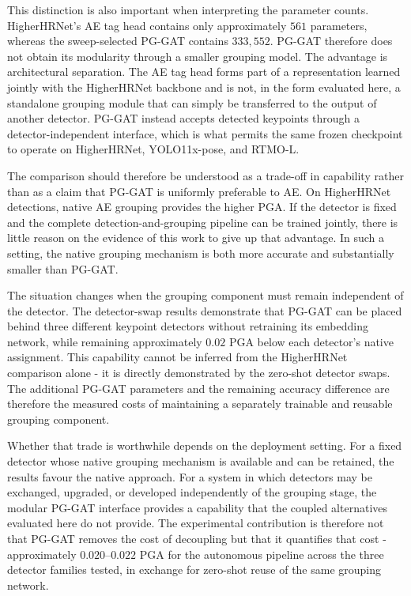 This distinction is also important when interpreting the parameter
counts.
HigherHRNet's AE tag head contains only approximately $561$ parameters,
whereas the sweep-selected PG-GAT contains $333{,}552$.
PG-GAT therefore does not obtain its modularity through a smaller
grouping model.
The advantage is architectural separation.
The AE tag head forms part of a representation learned jointly with the
HigherHRNet backbone and is not, in the form evaluated here,
a standalone grouping module that can simply be transferred to the
output of another detector.
PG-GAT instead accepts detected keypoints through a detector-independent
interface,
which is what permits the same frozen checkpoint to operate on
HigherHRNet,
YOLO11x-pose,
and RTMO-L.

The comparison should therefore be understood as a trade-off in
capability rather than as a claim that PG-GAT is uniformly preferable
to AE.
On HigherHRNet detections, native AE grouping provides the higher PGA.
If the detector is fixed and the complete detection-and-grouping
pipeline can be trained jointly, there is little reason on the evidence
of this work to give up that advantage.
In such a setting, the native grouping mechanism is both more accurate
and substantially smaller than PG-GAT.

The situation changes when the grouping component must remain
independent of the detector.
The detector-swap results demonstrate that PG-GAT can be placed behind
three different keypoint detectors without retraining its embedding
network,
while remaining approximately $0.02$ PGA below each detector's native
assignment.
This capability cannot be inferred from the HigherHRNet comparison alone -
it is directly demonstrated by the zero-shot detector swaps.
The additional PG-GAT parameters and the remaining accuracy difference
are therefore the measured costs of maintaining a separately trainable
and reusable grouping component.

Whether that trade is worthwhile depends on the deployment setting.
For a fixed detector whose native grouping mechanism is available and
can be retained, the results favour the native approach.
For a system in which detectors may be exchanged,
upgraded,
or developed independently of the grouping stage,
the modular PG-GAT interface provides a capability that the coupled
alternatives evaluated here do not provide.
The experimental contribution is therefore not that PG-GAT removes the
cost of decoupling
but that it quantifies that cost -
approximately $0.020$--$0.022$ PGA for the autonomous pipeline across the three detector families
tested,
in exchange for zero-shot reuse of the same grouping network.


